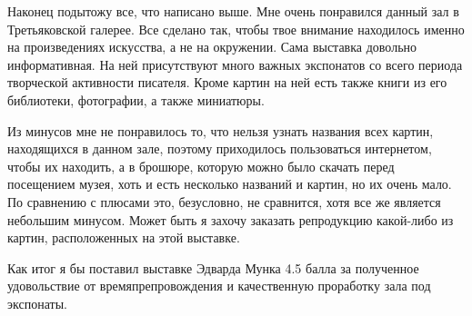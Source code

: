 \documentclass[a4paper, 12pt]{article}
\begin{document}
Наконец подытожу все, что написано выше. Мне очень понравился данный зал в Третьяковской галерее. Все сделано так, чтобы твое внимание находилось именно на произведениях искусства, а не на окружении. Сама выставка довольно информативная. На ней присутствуют много важных экспонатов со всего периода творческой активности писателя. Кроме картин на ней есть также книги из его библиотеки, фотографии, а также миниатюры.

Из минусов мне не понравилось то, что нельзя узнать названия всех картин, находящихся в данном зале, поэтому приходилось пользоваться интернетом, чтобы их находить, а в брошюре, которую можно было скачать перед посещением музея, хоть и есть несколько названий и картин, но их очень мало. По сравнению с плюсами это, безусловно, не сравнится, хотя все же является небольшим минусом. Может быть я захочу заказать репродукцию какой-либо из картин, расположенных на этой выставке.

Как итог я бы поставил выставке Эдварда Мунка 4.5 балла за полученное удовольствие от времяпрепровождения и качественную проработку зала под экспонаты.	
\end{document}
